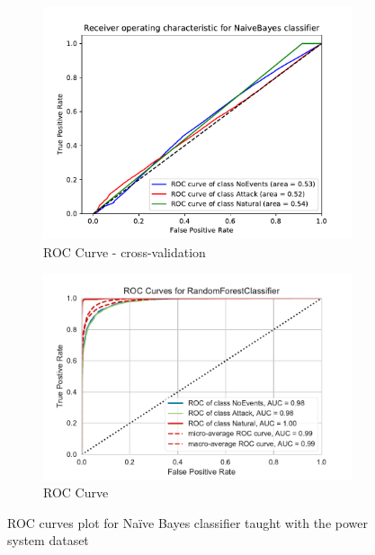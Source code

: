 \begin{figure}[t]
    \centering
    \begin{subfigure}[t]{110mm}
        \centering
        \includegraphics[page=1, width=\linewidth]{images/results_scikit/NaiveBayes}
        \caption{ROC Curve - cross-validation}
        \label{fig:scikit_NB_ROC}
    \end{subfigure}
    \begin{subfigure}[t]{110mm}
        \centering
        \includegraphics[page=4, width=\linewidth]{images/roc_3c}
        \caption{ROC Curve}
        \label{fig:scikit_RF_ROC}
    \end{subfigure}
    \caption{ROC curves plot for Naïve Bayes classifier taught with the power system dataset}
    \label{fig:ROCCM_NB}
\end{figure}


